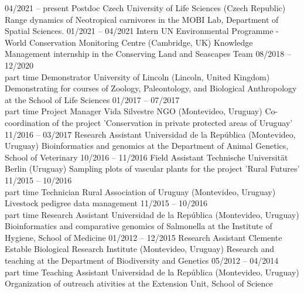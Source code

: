 \documentclass[9pt]{developercv} %
\begin{document}


\begin{entrylist}
	\entry
		{04/2021 -- present}
		{Postdoc}
		{Czech University of Life Sciences (Czech Republic)}
		{Range dynamics of Neotropical carnivores in the MOBI Lab, Department of Spatial Sciences.}
	\entry
		{01/2021 -- 04/2021}
		{Intern}
		{UN Environmental Programme - World Conservation Monitoring Centre (Cambridge, UK)}
		{Knowledge Management internship in the Conserving Land and Seascapes Team}
	\entry
		{08/2018 -- 12/2020\\\footnotesize{part time}}
		{Demonstrator}
		{University of Lincoln (Lincoln, United Kingdom)}
		{Demonstrating for courses of Zoology, Paleontology, and Biological Anthropology at the School of Life Sciences}
	\entry
		{01/2017 -- 07/2017\\\footnotesize{part time}}
		{Project Manager}
		{Vida Silvestre NGO (Montevideo, Uruguay)}
		{Co-coordination of the project 'Conservation in private protected areas of Uruguay'}
	\entry
		{11/2016 -- 03/2017}
		{Research Assistant}
		{Universidad de la Rep\'{u}blica (Montevideo, Uruguay)}
		{Bioinformatics and genomics at the Department of Animal Genetics, School of Veterinary}
	\entry
		{10/2016 -- 11/2016}
		{Field Assistant}
		{Technische Universität Berlin (Uruguay)}
		{Sampling plots of vascular plants for the project 'Rural Futures'}
	\entry
		{11/2015 -- 10/2016\\\footnotesize{part time}}
		{Technician}
		{Rural Association of Uruguay (Montevideo, Uruguay)}
		{Livestock pedigree data management}
	\entry
		{11/2015 -- 10/2016\\\footnotesize{part time}}
		{Research Assistant}
		{Universidad de la Rep\'{u}blica (Montevideo, Uruguay)}
		{Bioinformatics and comparative genomics of Salmonella at the Institute of Hygiene, School of Medicine}
	\entry
		{01/2012 -- 12/2015}
		{Research Assistant}
		{Clemente Estable Biological Research Institute (Montevideo, Uruguay)}
		{Research and teaching at the Department of Biodiversity and Genetics}
	\entry
		{05/2012 -- 04/2014\\\footnotesize{part time}}
		{Teaching Assistant}
		{Universidad de la Rep\'{u}blica (Montevideo, Uruguay)}
		{Organization of outreach ativities at the Extension Unit, School of Science}
\end{entrylist}
\end{document}
